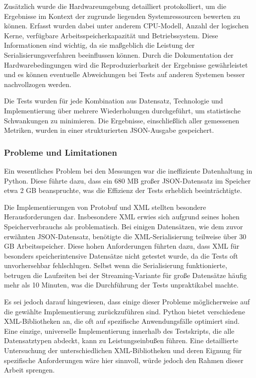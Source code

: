 \documentclass[ngerman]{seminarvorlage}
\begin{document}
Zusätzlich wurde die Hardwareumgebung detailliert protokolliert, um die Ergebnisse im Kontext der zugrunde liegenden Systemressourcen bewerten zu können. Erfasst wurden dabei unter anderem CPU-Modell, Anzahl der logischen Kerne, verfügbare Arbeitsspeicherkapazität und Betriebssystem. Diese Informationen sind wichtig, da sie maßgeblich die Leistung der Serialisierungsverfahren beeinflussen können. Durch die Dokumentation der Hardwarebedingungen wird die Reproduzierbarkeit der Ergebnisse gewährleistet und es können eventuelle Abweichungen bei Tests auf anderen Systemen besser nachvollzogen werden.

Die Tests wurden für jede Kombination aus Datensatz, Technologie und Implementierung über mehrere Wiederholungen durchgeführt, um statistische Schwankungen zu minimieren. Die Ergebnisse, einschließlich aller gemessenen Metriken, wurden in einer strukturierten JSON-Ausgabe gespeichert.

\subsubsection{Probleme und Limitationen}

Ein wesentliches Problem bei den Messungen war die ineffiziente Datenhaltung in Python. Diese führte dazu, dass ein 680 MB großer JSON-Datensatz im Speicher etwa 2 GB beanspruchte, was die Effizienz der Tests erheblich beeinträchtigte.

Die Implementierungen von Protobuf und XML stellten besondere Herausforderungen dar. Insbesondere XML erwies sich aufgrund seines hohen Speicherverbrauchs als problematisch. Bei einigen Datensätzen, wie dem zuvor erwähnten JSON-Datensatz, benötigte die XML-Serialisierung teilweise über 30 GB Arbeitsspeicher. Diese hohen Anforderungen führten dazu, dass XML für besonders speicherintensive Datensätze nicht getestet wurde, da die Tests oft unvorhersehbar fehlschlugen. Selbst wenn die Serialisierung funktionierte, betrugen die Laufzeiten bei der Streaming-Variante für große Datensätze häufig mehr als 10 Minuten, was die Durchführung der Tests unpraktikabel machte.

Es sei jedoch darauf hingewiesen, dass einige dieser Probleme möglicherweise auf die gewählte Implementierung zurückzuführen sind. Python bietet verschiedene XML-Bibliotheken an, die oft auf spezifische Anwendungsfälle optimiert sind. Eine einzige, universelle Implementierung innerhalb des Testskripts, die alle Datensatztypen abdeckt, kann zu Leistungseinbußen führen. Eine detaillierte Untersuchung der unterschiedlichen XML-Bibliotheken und deren Eignung für spezifische Anforderungen wäre hier sinnvoll, würde jedoch den Rahmen dieser Arbeit sprengen.
\end{document}
